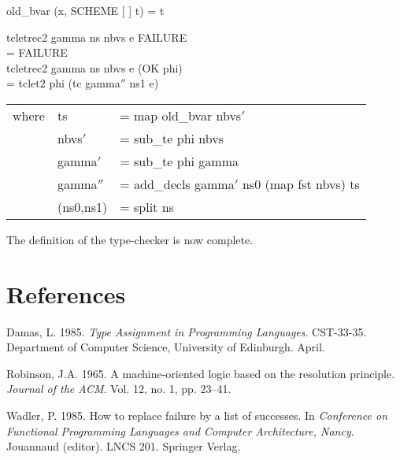 \begin{mlcoded}
    old\_bvar (x, SCHEME [ ] t) = t
\end{mlcoded}

\begin{mlcoded}
    tcletrec2 gamma ns nbvs e FAILURE \\
    \hspace*{0.75cm}= FAILURE \\
    tcletrec2 gamma ns nbvs e (OK phi) \\
    \hspace*{0.75cm}= tclet2 phi (tc gamma$''$ ns1 e) \\
    \begin{tabular}{@{}r@{\hspace{4pt}}l@{\hspace{4pt}}l}
        \hspace*{1.2cm}where &ts       &= map old\_bvar nbvs$'$ \\
        &nbvs$'$   &= sub\_te phi nbvs \\
        &gamma$'$  &= sub\_te phi gamma \\
        &gamma$''$ &= add\_decls gamma$'$ ns0 (map fst nbvs) ts \\
        &(ns0,ns1) &= split ns
    \end{tabular}
\end{mlcoded}
The definition of the type-checker is now complete.

\section*{References}

\begin{references}

    \item Damas, L. 1985. \textit{Type Assignment in Programming Languages}. CST-33-35.
    Department of Computer Science, University of Edinburgh. April.

    \item Robinson, J.A. 1965. A machine-oriented logic based on the resolution principle.
    \textit{Journal of the ACM}. Vol. 12, no. 1, pp. 23–41.

    \item Wadler, P. 1985. How to replace failure by a list of successes. In \textit{Conference on
        Functional Programming Languages and Computer Architecture, Nancy}.
    Jouannaud (editor). LNCS 201. Springer Verlag.

\end{references}